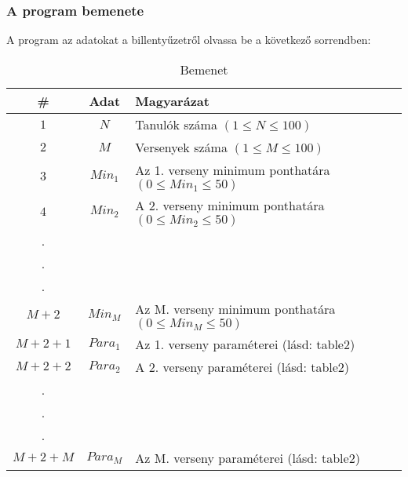 \documentclass[a4paper]{article}
\begin{document}
      \subsubsection{A program bemenete}
        A program az adatokat a billentyűzetről olvassa be a következő sorrendben:
        \begin{table}[H]
          \centering
          \caption{Bemenet}
          \label{tab:table1}
          \begin{tabular}{ccl}
            \toprule
            \# & Adat & Magyarázat \\
            \midrule
            $1$ & $N$ & Tanulók száma $(1 \leqslant N \leqslant 100)$ \\
            $2$ & $M$ & Versenyek száma $(1 \leqslant M \leqslant 100)$ \\
            $3$ & $Min_1$ & Az 1. verseny minimum ponthatára $(0 \leqslant Min_1 \leqslant 50)$ \\
            $4$ & $Min_2$ & A 2. verseny minimum ponthatára $(0 \leqslant Min_2 \leqslant 50)$ \\
            . \\
            . \\
            . \\
            $M+2$ & $Min_M$ & Az M. verseny minimum ponthatára $(0 \leqslant Min_M \leqslant 50)$ \\
            $M+2+1$ & $Para_1$ & Az 1. verseny paraméterei (lásd: table2) \\
            $M+2+2$ & $Para_2$ & A 2. verseny paraméterei (lásd: table2) \\
            . \\
            . \\
            . \\
            $M+2+M$ & $Para_M$ & Az M. verseny paraméterei (lásd: table2) \\
            \bottomrule
          \end{tabular}
        \end{table}
\end{document}
